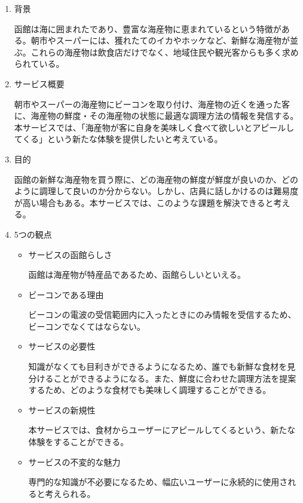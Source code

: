 \begin{enumerate}
    \item 背景
    \par 函館は海に囲まれたであり、豊富な海産物に恵まれているという特徴がある。朝市やスーパーには、獲れたてのイカやホッケなど、新鮮な海産物が並ぶ。これらの海産物は飲食店だけでなく、地域住民や観光客からも多く求められている。
    \item サービス概要
    \par 朝市やスーパーの海産物にビーコンを取り付け、海産物の近くを通った客に、海産物の鮮度・その海産物の状態に最適な調理方法の情報を発信する。本サービスでは、「海産物が客に自身を美味しく食べて欲しいとアピールしてくる」という新たな体験を提供したいと考えている。
    \item 目的
    \par 函館の新鮮な海産物を買う際に、どの海産物の鮮度が鮮度が良いのか、どのように調理して良いのか分からない。しかし、店員に話しかけるのは難易度が高い場合もある。本サービスでは、このような課題を解決できると考える。
    \item 5つの観点
    \begin{itemize}
       \item サービスの函館らしさ
        \par 函館は海産物が特産品であるため、函館らしいといえる。
        \item ビーコンである理由
        \par ビーコンの電波の受信範囲内に入ったときにのみ情報を受信するため、ビーコンでなくてはならない。
        \item サービスの必要性
        \par 知識がなくても目利きができるようになるため、誰でも新鮮な食材を見分けることができるようになる。また、鮮度に合わせた調理方法を提案するため、どのような食材でも美味しく調理することができる。
        \item サービスの新規性
        \par 本サービスでは、食材からユーザーにアピールしてくるという、新たな体験をすることができる。
        \item サービスの不変的な魅力
        \par 専門的な知識が不必要になるため、幅広いユーザーに永続的に使用されると考えられる。
    \end{itemize}
\end{enumerate}

